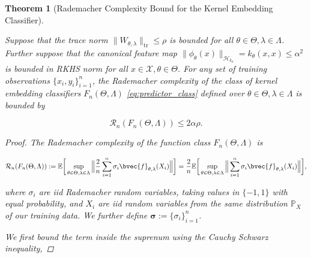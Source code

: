 \documentclass{article}
\newtheorem{theorem}{Theorem}[section]
\begin{document}
		\begin{theorem}[Rademacher Complexity Bound for the Kernel Embedding Classifier]
		\label{thm:rademacher_complexity_bound}
		
			Suppose that the trace norm $\| W_{\theta, \lambda} \|_{\mathrm{tr}} \leq \rho$ is bounded for all $\theta \in \Theta, \lambda \in \Lambda$. Further suppose that the canonical feature map $\| \phi_{\theta}(x) \|_{\mathcal{H}_{k_{\theta}}} = k_{\theta}(x, x) \leq \alpha^{2}$ is bounded in RKHS norm for all $x \in \mathcal{X}, \theta \in \Theta$. For any set of training observations $\{x_{i}, y_{i}\}_{i = 1}^{n}$, the Rademacher complexity of the class of kernel embedding classifiers $F_{n}(\Theta, \Lambda)$ \eqref{eq:predictor_class} defined over $\theta \in \Theta, \lambda \in \Lambda$ is bounded by
				
			\begin{equation}
				\mathcal{R}_{n}(F_{n}(\Theta, \Lambda)) \leq 2 \alpha \rho.
			\label{eq:rademacher_complexity_bound}
			\end{equation}
	
			\begin{proof}
			
				The Rademacher complexity \citep[Definition 2]{bartlett2002rademacher} of the function class $F_{n}(\Theta, \Lambda)$ is 
				
				\begin{equation}
					\mathcal{R}_{n}(F_{n}(\Theta, \Lambda)) := \mathbb{E}\bigg[\sup_{\theta \in \Theta, \lambda \in \Lambda} \Big\| \frac{2}{n} \sum_{i = 1}^{n} \sigma_{i}\bvec{f}_{\theta, \lambda}(X_{i}) \Big\|\bigg] = \frac{2}{n} \mathbb{E}\bigg[\sup_{\theta \in \Theta, \lambda \in \Lambda} \Big\| \sum_{i = 1}^{n} \sigma_{i}\bvec{f}_{\theta, \lambda}(X_{i}) \Big\|\bigg],
				\end{equation}
				
				where $\sigma_{i}$ are \textit{iid} Rademacher random variables, taking values in $\{-1, 1\}$ with equal probability, and $X_{i}$ are \textit{iid} random variables from the same distribution $\mathbb{P}_{X}$ of our training data. We further define $\bm{\sigma} := \{\sigma_{i}\}_{i = 1}^{n}$.
				
				We first bound the term inside the suprenum using the Cauchy Schwarz inequality,
				

\end{proof}
\end{theorem}
\end{document}

